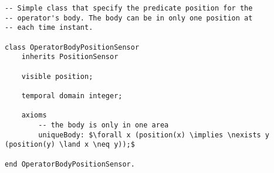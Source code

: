 \begin{lstlisting}[fontadjust, mathescape, frame=single] 
-- Simple class that specify the predicate position for the 
-- operator's body. The body can be in only one position at
-- each time instant.

class OperatorBodyPositionSensor
    inherits PositionSensor

    visible position;

    temporal domain integer;

    axioms
        -- the body is only in one area
        uniqueBody: $\forall x (position(x) \implies \nexists y (position(y) \land x \neq y));$

end OperatorBodyPositionSensor.
\end{lstlisting}